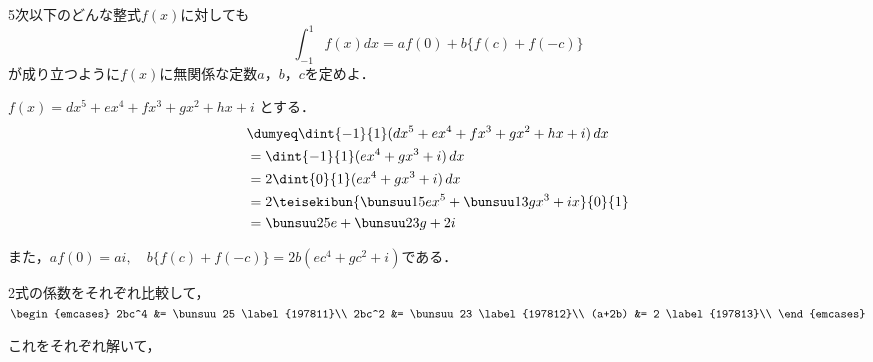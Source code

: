 \begin{problem}
5次以下のどんな整式$f(x)$に対しても
\[ \int_{-1}^1f(x)dx=af(0)+b\{ f(c)+f(-c) \} \]
が成り立つように$f(x)$に無関係な定数$a$，$b$，$c$を定めよ．
\end{problem}

$f(x) = dx^5 + ex^4 + fx^3 + gx^2 + hx + i$ とする．
\begin{align*}
  &\dumyeq \dint{-1}{1}(dx^5 + ex^4 + fx^3 + gx^2 + hx + i)\,dx\\
  &= \dint{-1}{1} (ex^4 + gx^3 + i) \,dx\\
  &= 2\dint{0}{1} (ex^4 + gx^3 + i) \,dx\\
  &= 2\teisekibun{\bunsuu15 ex^5 + \bunsuu13 gx^3 + ix}{0}{1}\\
  &= \bunsuu25 e + \bunsuu23 g + 2i
\end{align*}

また，$af(0) = ai,\quad b\{f(c) + f(-c)\} = 2b(ec^4 + gc^2 + i)$である．

2式の係数をそれぞれ比較して，
$\begin{emcases}
  2bc^4 &= \bunsuu25 \label{197811}\\
  2bc^2 &= \bunsuu23 \label{197812}\\
  (a+2b) &= 2 \label{197813}\\
\end{emcases}$

これをそれぞれ解いて，
